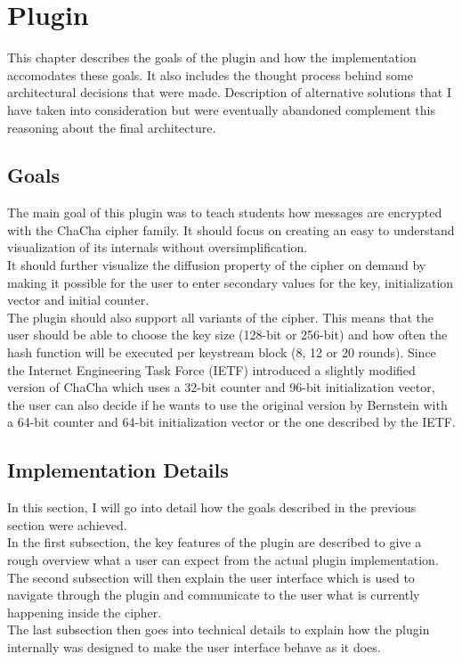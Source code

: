 %

\chapter{Plugin}
\label{chap:Plugin}

This chapter describes the goals of the plugin and how the implementation accomodates these goals. It also includes the thought process behind some architectural decisions that were made. Description of alternative solutions that I have taken into consideration but were eventually abandoned complement this reasoning about the final architecture.

\section{Goals}
\label{sec:goals}

The main goal of this plugin was to teach students how messages are encrypted with the ChaCha cipher family. It should focus on creating an easy to understand visualization of its internals without oversimplification. \\
It should further visualize the diffusion property of the cipher on demand by making it possible for the user to enter secondary values for the key, initialization vector and initial counter.\\
The plugin should also support all variants of the cipher. This means that the user should be able to choose the key size (128-bit or 256-bit) and how often the hash function will be executed per keystream block (8, 12 or 20 rounds). 
Since the Internet Engineering Task Force (IETF) introduced a slightly modified version of ChaCha which uses a 32-bit counter and 96-bit initialization vector, the user can also decide if he wants to use the original version by Bernstein with a 64-bit counter and 64-bit initialization vector or the one described by the IETF.

\section{Implementation Details}
\label{sec:implementationDetails}

In this section, I will go into detail how the goals described in the previous section were achieved. \\
In the first subsection, the key features of the plugin are described to give a rough overview what a user can expect from the actual plugin implementation. \\
The second subsection will then explain the user interface which is used to navigate through the plugin and communicate to the user what is currently happening inside the cipher. \\
The last subsection then goes into technical details to explain how the plugin internally was designed to make the user interface behave as it does.

